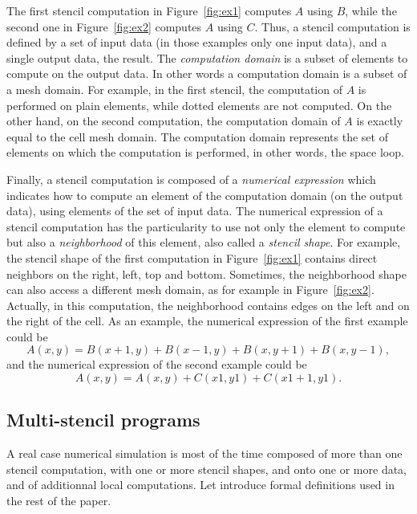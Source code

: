 
The first stencil computation in Figure~\ref{fig:ex1} computes $A$ using $B$, while the second one in Figure~\ref{fig:ex2} computes $A$ using $C$. Thus, a stencil computation is defined by a set of input data (in those examples only one input data), and a single output data, the result. The \emph{computation domain} is a subset of elements to compute on the output data. In other words a computation domain is a subset of a mesh domain. For example, in the first stencil, the computation of $A$ is performed on plain elements, while dotted elements are not computed. On the other hand, on the second computation, the computation domain of $A$ is exactly equal to the cell mesh domain. The computation domain represents the set of elements on which the computation is performed, in other words, the space loop.

Finally, a stencil computation is composed of a \emph{numerical expression} which indicates how to compute an element of the computation domain (on the output data), using elements of the set of input data. The numerical expression of a stencil computation has the particularity to use not only the element to compute but also a \emph{neighborhood} of this element, also called a \emph{stencil shape}. For example, the stencil shape of the first computation in Figure~\ref{fig:ex1} contains direct neighbors on the right, left, top and bottom. Sometimes, the neighborhood shape can also access a different mesh domain, as for example in Figure~\ref{fig:ex2}. Actually, in this computation, the neighborhood contains edges on the left and on the right of the cell. As an example, the numerical expression of the first example could be
\begin{equation*} 
A(x,y) = B(x+1,y)+B(x-1,y)+B(x,y+1)+B(x,y-1),
\end{equation*}
and the numerical expression of the second example could be
\begin{equation*} 
A(x,y) = A(x,y)+C(x1,y1)+C(x1+1,y1).
\end{equation*}

\subsection{Multi-stencil programs}
\label{sect:multistencil}
A real case numerical simulation is most of the time composed of more than one stencil computation, with one or more stencil shapes, and onto one or more data, and of additionnal local computations. Let introduce formal definitions used in the rest of the paper.

